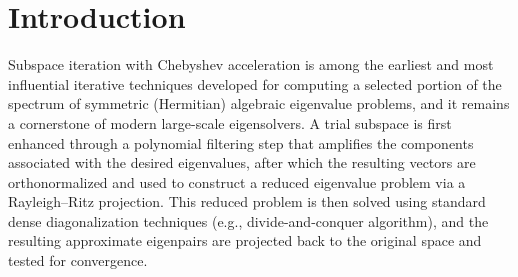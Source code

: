 \section{Introduction}
\label{sec-1}

Subspace iteration with Chebyshev acceleration is among the earliest and most influential iterative techniques developed for computing a selected portion of the spectrum of symmetric (Hermitian) algebraic eigenvalue problems, and it remains a cornerstone of modern large-scale eigensolvers. A trial subspace is first enhanced through a polynomial filtering step that amplifies the components associated with the desired eigenvalues, after which the resulting vectors are orthonormalized and used to construct a reduced eigenvalue problem via a Rayleigh–Ritz projection. This reduced problem is then solved using standard dense diagonalization techniques (e.g., divide-and-conquer algorithm), and the resulting approximate eigenpairs are projected back to the original space and tested for convergence. 

